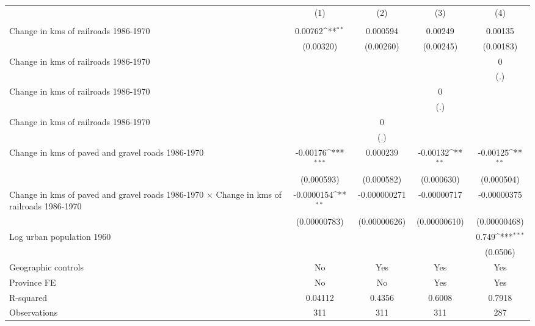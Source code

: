 {
\def\sym#1{\ifmmode^{#1}\else\(^{#1}\)\fi}
\begin{tabular}{l*{4}{c}}
\hline\hline
                &\multicolumn{1}{c}{(1)}&\multicolumn{1}{c}{(2)}&\multicolumn{1}{c}{(3)}&\multicolumn{1}{c}{(4)}\\
                &\multicolumn{1}{c}{}&\multicolumn{1}{c}{}&\multicolumn{1}{c}{}&\multicolumn{1}{c}{}\\
\hline
Change in kms of railroads 1986-1970&  0.00762\sym{**} & 0.000594         &  0.00249         &  0.00135         \\
                &(0.00320)         &(0.00260)         &(0.00245)         &(0.00183)         \\
[1em]
Change in kms of railroads 1986-1970&                  &                  &                  &        0         \\
                &                  &                  &                  &      (.)         \\
[1em]
Change in kms of railroads 1986-1970&                  &                  &        0         &                  \\
                &                  &                  &      (.)         &                  \\
[1em]
Change in kms of railroads 1986-1970&                  &        0         &                  &                  \\
                &                  &      (.)         &                  &                  \\
[1em]
Change in kms of paved and gravel roads 1986-1970& -0.00176\sym{***}& 0.000239         & -0.00132\sym{**} & -0.00125\sym{**} \\
                &(0.000593)         &(0.000582)         &(0.000630)         &(0.000504)         \\
[1em]
Change in kms of paved and gravel roads 1986-1970 $\times$ Change in kms of railroads 1986-1970&-0.0000154\sym{**} &-0.000000271         &-0.00000717         &-0.00000375         \\
                &(0.00000783)         &(0.00000626)         &(0.00000610)         &(0.00000468)         \\
[1em]
Log urban population 1960&                  &                  &                  &    0.749\sym{***}\\
                &                  &                  &                  & (0.0506)         \\
\hline
Geographic controls&       No         &      Yes         &      Yes         &      Yes         \\
Province FE     &       No         &       No         &      Yes         &      Yes         \\
R-squared       &  0.04112         &   0.4356         &   0.6008         &   0.7918         \\
Observations    &      311         &      311         &      311         &      287         \\
\hline\hline
\end{tabular}
}
